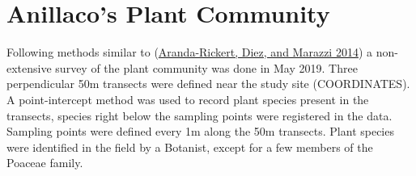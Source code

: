 \documentclass[english,msc,numbers,hidelinks]{coppe}
\begin{document}
  \hypertarget{anillacos-plant-community}{%
  \section{Anillaco's Plant Community}\label{anillacos-plant-community}}

  Following methods similar to (\protect\hyperlink{ref-aranda-rickert2014}{Aranda-Rickert, Diez, and Marazzi 2014}) a non-extensive survey of the plant community was done in May 2019. Three perpendicular 50m transects were defined near the study site (COORDINATES). A point-intercept method was used to record plant species present in the transects, species right below the sampling points were registered in the data. Sampling points were defined every 1m along the 50m transects. Plant species were identified in the field by a Botanist, except for a few members of the Poaceae family.
\end{document}
